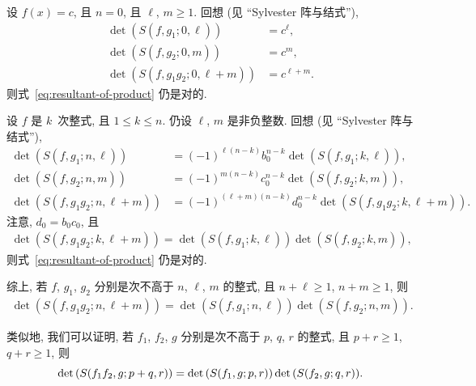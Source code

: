 \documentclass[../libro.tex]{subfiles}
\begin{document}
\begin{example}
    设 \(f(x) = c\), 且 \(n = 0\),
    且 \(\ell\), \(m \geq 1\).
    回想 (见 ``Sylvester 阵与结式''),
    \begin{align*}
        \det {(S(f, g_1; 0, \ell))} & = c^{\ell}, \\
        \det {(S(f, g_2; 0, m))} & = c^m, \\
        \det {(S(f, g_1 g_2; 0, \ell + m))} & = c^{\ell + m}.
    \end{align*}
    则式~\eqref{eq:resultant-of-product} 仍是对的.

    设 \(f\) 是 \(k\)~次整式, 且 \(1 \leq k \leq n\).
    仍设 \(\ell\), \(m\) 是非负整数.
    回想 (见 ``Sylvester 阵与结式''),
    \begin{align*}
        \det {(S(f, g_1; n, \ell))}
        & = (-1)^{\ell (n-k)} b_0^{n-k}
        \det {(S(f, g_1; k, \ell))},
        \\
        \det {(S(f, g_2; n, m))}
        & = (-1)^{m (n-k)} c_0^{n-k}
        \det {(S(f, g_2; k, m))},
        \\
        \det {(S(f, g_1 g_2; n, \ell + m))}
        & = (-1)^{(\ell+m) (n-k)} d_0^{n-k}
        \det {(S(f, g_1 g_2; k, \ell + m))}.
    \end{align*}
    注意, \(d_0 = b_0 c_0\),
    且
    \begin{align*}
        \det {(S(f, g_1 g_2; k, \ell + m))}
        = \det {(S(f, g_1; k, \ell))} \det {(S(f, g_2; k, m))},
    \end{align*}
    则式~\eqref{eq:resultant-of-product} 仍是对的.

    综上, 若 \(f\), \(g_1\), \(g_2\)
    分别是次不高于 \(n\), \(\ell\), \(m\) 的整式,
    且 \(n + \ell \geq 1\), \(n + m \geq 1\),
    则
    \begin{align*}
        \det {(S(f, g_1 g_2; n, \ell + m))}
        = \det {(S(f, g_1; n, \ell))} \det {(S(f, g_2; n, m))}.
    \end{align*}

    类似地, 我们可以证明,
    若 \(f_1\), \(f_2\), \(g\)
    分别是次不高于 \(p\), \(q\), \(r\) 的整式,
    且 \(p + r \geq 1\), \(q + r \geq 1\),
    则
    \begin{equation*}
        \det {(S(f_1 f_2, g; p + q, r))}
        = \det {(S(f_1, g; p, r))} \det {(S(f_2, g; q, r))}.
        \qedhere
    \end{equation*}
\end{example}
\end{document}
